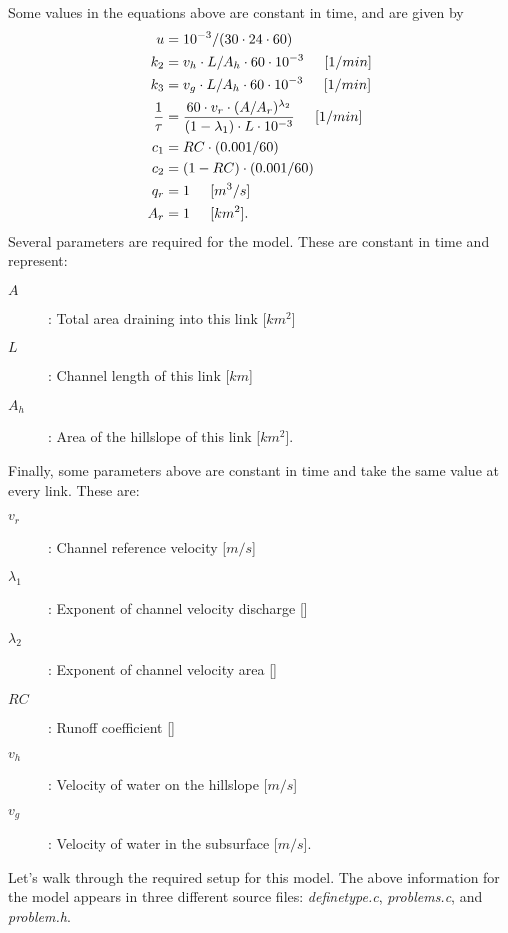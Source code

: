 \documentclass[12pt]{article}
\begin{document}
Some values in the equations above are constant in time, and are given by
\begin{align*}
 u &= 10^{-3}/(30\cdot24\cdot60) \\
 k_2 &= v_h \cdot L / A_h \cdot 60 \cdot 10^{-3} \hspace{.2in} [1/min] \\
 k_3 &= v_g \cdot L / A_h \cdot 60 \cdot 10^{-3} \hspace{.2in} [1/min] \\
 \frac{1}{\tau} &= \frac{60 \cdot v_r \cdot (A/A_r)^{\lambda_2}}{(1-\lambda_1) \cdot L \cdot 10^{-3}} \hspace{.2in} [1/min] \\
 c_1 &= RC \cdot (0.001/60) \\
 c_2 &= (1-RC) \cdot (0.001/60) \\
 q_r &= 1 \hspace{.2in} [m^3/s] \\
 A_r &= 1 \hspace{.2in} [km^2].
\end{align*}
Several parameters are required for the model. These are constant in time and represent:
\begin{description}
 \item[$A$]: Total area draining into this link [$km^2$]
 \item[$L$]: Channel length of this link [$km$]
 \item[$A_h$]: Area of the hillslope of this link [$km^2$].
\end{description}
Finally, some parameters above are constant in time and take the same value at every link. These are:
\begin{description}
 \item[$v_r$]: Channel reference velocity [$m/s$]
 \item[$\lambda_1$]: Exponent of channel velocity discharge []
 \item[$\lambda_2$]: Exponent of channel velocity area []
 \item[$RC$]: Runoff coefficient []
 \item[$v_h$]: Velocity of water on the hillslope [$m/s$]
 \item[$v_g$]: Velocity of water in the subsurface [$m/s$].
\end{description}


Let's walk through the required setup for this model. The above information for the model appears in three different source files: \emph{definetype.c}, \emph{problems.c}, and \emph{problem.h}.
\end{document}
